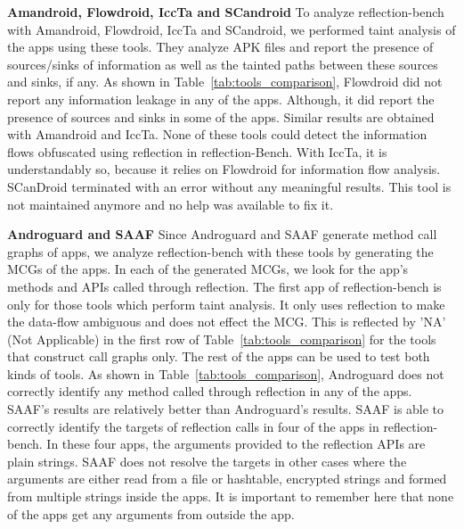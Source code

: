 \begin{description}[style=unboxed,leftmargin=0cm]


\item \textbf{Amandroid, Flowdroid, IccTa and SCandroid} To analyze reflection-bench with Amandroid, Flowdroid, IccTa and SCandroid, we performed taint analysis of the apps using these tools. They analyze APK files and report the presence of sources/sinks of information as well as the tainted paths between these sources and sinks, if any. As shown in Table~\ref{tab:tools_comparison}, Flowdroid did not report any information leakage in any of the apps. Although, it did report the presence of sources and sinks in some of the apps. Similar results are obtained with Amandroid and IccTa. None of these tools could detect the information flows obfuscated using reflection in reflection-Bench. With IccTa, it is understandably so, because it relies on Flowdroid for information flow analysis. SCanDroid terminated with an error without any meaningful results. This tool is not maintained anymore and no help was available to fix it. 

\iffalse

\textbf{Flowdroid}

1. Sources 4, sinks 2, paths none.
2. 0, 0, 0
3. 0, 0, 0
4. 0, 0, 0
5. 0, 0, 0
6. 0, 0, 0
7. 3, 1, 0
8. 0, 0, 0
9. 0, 0, 0
10. 0, 0, 0
11. 0, 0, 0
12. 0, 0, 0
13. 0, 0, 0
14. 0, 0, 0


\textbf{IccTa}

Based on Flowdroid and Epicc (now replaced with IC3).

\todo[inline]{Try the experiment again.}

\textbf{SCandroid}

\todo[inline]{Analysis ends with error!
Try again.}

\fi

\item \textbf{Androguard and SAAF} Since Androguard and SAAF generate method call graphs of apps, we analyze reflection-bench with these tools by generating the MCGs of the apps. In each of the generated MCGs, we look for the app's methods and APIs called through reflection. The first app of reflection-bench is only for those tools which perform taint analysis. It only uses reflection to make the data-flow ambiguous and does not effect the MCG. This is reflected by 'NA' (Not Applicable) in the first row of Table~\ref{tab:tools_comparison} for the tools that construct call graphs only. The rest of the apps can be used to test both kinds of tools. As shown in Table~\ref{tab:tools_comparison}, Androguard does not correctly identify any method called through reflection in any of the apps. SAAF's results are relatively better than Androguard's results. SAAF is able to correctly identify the targets of reflection calls in four of the apps in reflection-bench. In these four apps, the arguments provided to the reflection APIs are plain strings. SAAF does not resolve the targets in other cases where the arguments are either read from a file or hashtable, encrypted strings and formed from multiple strings inside the apps. It is important to remember here that none of the apps get any arguments from outside the app.



\end{description}
